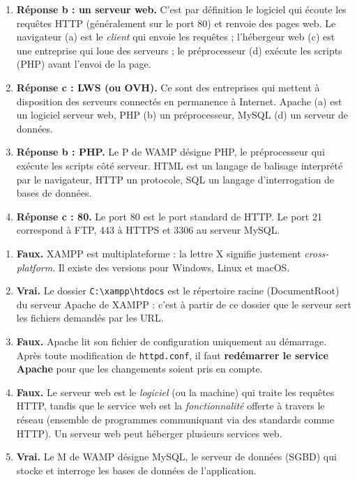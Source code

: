 \documentclass[11pt]{article}
\newcommand{\cle}[1]{{\popxbold\color{popdark}#1}}
\begin{document}
\begin{corrige}
\begin{enumerate}
\item \textbf{Réponse b : un \cle{serveur web}.} C'est par définition le logiciel qui écoute les requêtes \cle{HTTP} (généralement sur le port 80) et renvoie des pages web. Le navigateur (a) est le \emph{client} qui envoie les requêtes ; l'\cle{hébergeur web} (c) est une entreprise qui loue des serveurs ; le \cle{préprocesseur} (d) exécute les scripts (PHP) avant l'envoi de la page.
\item \textbf{Réponse c : LWS (ou OVH).} Ce sont des entreprises qui mettent à disposition des serveurs connectés en permanence à Internet. \cle{Apache} (a) est un logiciel serveur web, \cle{PHP} (b) un préprocesseur, \cle{MySQL} (d) un serveur de données.
\item \textbf{Réponse b : \cle{PHP}.} Le \og P \fg{} de \cle{WAMP} désigne PHP, le préprocesseur qui exécute les scripts côté serveur. \cle{HTML} est un langage de balisage interprété par le navigateur, \cle{HTTP} un protocole, \cle{SQL} un langage d'interrogation de bases de données.
\item \textbf{Réponse c : 80.} Le port 80 est le port standard de HTTP. Le port 21 correspond à \cle{FTP}, 443 à \cle{HTTPS} et 3306 au serveur MySQL.
\end{enumerate}
\end{corrige}

\begin{corrige}
\begin{enumerate}
\item \textbf{Faux.} \cle{XAMPP} est multiplateforme : la lettre \og X \fg{} signifie justement \emph{cross-platform}. Il existe des versions pour Windows, Linux et macOS.
\item \textbf{Vrai.} Le dossier \texttt{C:\textbackslash xampp\textbackslash htdocs} est le \cle{répertoire racine} (\cle{DocumentRoot}) du serveur Apache de XAMPP : c'est à partir de ce dossier que le serveur sert les fichiers demandés par les URL.
\item \textbf{Faux.} Apache lit son \cle{fichier de configuration} uniquement au démarrage. Après toute modification de \texttt{httpd.conf}, il faut \textbf{redémarrer le service Apache} pour que les changements soient pris en compte.
\item \textbf{Faux.} Le \cle{serveur web} est le \emph{logiciel} (ou la machine) qui traite les requêtes HTTP, tandis que le \cle{service web} est la \emph{fonctionnalité} offerte à travers le réseau (ensemble de programmes communiquant via des standards comme HTTP). Un serveur web peut héberger plusieurs services web.
\item \textbf{Vrai.} Le \og M \fg{} de \cle{WAMP} désigne \cle{MySQL}, le \cle{serveur de données} (SGBD) qui stocke et interroge les bases de données de l'application.
\end{enumerate}
\end{corrige}
\end{document}
